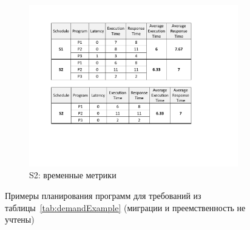 \begin{figure}
\begin{minipage}{.7\columnwidth}
\begin{subfigure}{\linewidth}
\includegraphics[width=\linewidth]{figs/s2Metrics.pdf}
\caption{S2: временные метрики}
\vspace{1mm}
\label{fig:s2Metrics}
\end{subfigure}
\end{minipage}%

\caption{Примеры планирования программ для требований из таблицы~\ref{tab:demandExample} (миграции и преемственность не учтены)}
\label{fig:twoSchedulesExample}
\vspace{-3mm}
\end{figure}




















